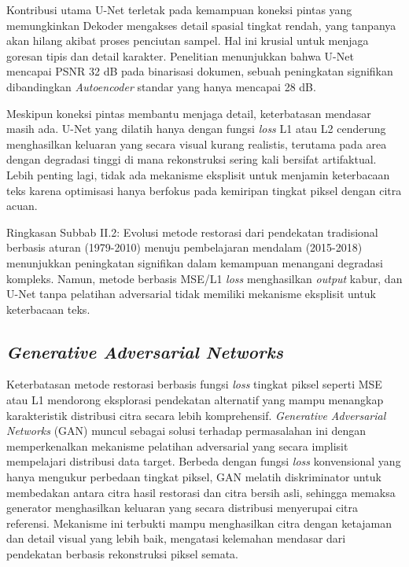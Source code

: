 \documentclass[12pt,a4paper]{article}
\begin{document}
\begin{enumerate}[leftmargin=*, labelindent=0pt, itemsep=1ex, topsep=0pt]
Kontribusi utama U-Net terletak pada kemampuan koneksi pintas yang memungkinkan Dekoder mengakses detail spasial tingkat rendah, yang tanpanya akan hilang akibat proses penciutan sampel. Hal ini krusial untuk menjaga goresan tipis dan detail karakter. Penelitian \parencite{tensmeyer2017} menunjukkan bahwa U-Net mencapai PSNR 32 dB pada binarisasi dokumen, sebuah peningkatan signifikan dibandingkan \textit{Autoencoder} standar yang hanya mencapai 28 dB.

Meskipun koneksi pintas membantu menjaga detail, keterbatasan mendasar masih ada. U-Net yang dilatih hanya dengan fungsi \textit{loss} L1 atau L2 cenderung menghasilkan keluaran yang secara visual kurang realistis, terutama pada area dengan degradasi tinggi di mana rekonstruksi sering kali bersifat artifaktual. Lebih penting lagi, tidak ada mekanisme eksplisit untuk menjamin keterbacaan teks karena optimisasi hanya berfokus pada kemiripan tingkat piksel dengan citra acuan.

\end{enumerate}

Ringkasan Subbab II.2: Evolusi metode restorasi dari pendekatan tradisional berbasis aturan (1979-2010) menuju pembelajaran mendalam (2015-2018) menunjukkan peningkatan signifikan dalam kemampuan menangani degradasi kompleks. Namun, metode berbasis MSE/L1 \textit{loss} menghasilkan \textit{output} kabur, dan U-Net tanpa \textnormal{pelatihan adversarial} tidak memiliki mekanisme eksplisit untuk keterbacaan teks.


\subsection{\textit{Generative Adversarial Networks}}
\label{subsec:gan-theory}

Keterbatasan metode restorasi berbasis fungsi \textit{loss} tingkat piksel seperti MSE atau L1 mendorong eksplorasi pendekatan alternatif yang mampu menangkap karakteristik distribusi citra secara lebih komprehensif. \textit{Generative Adversarial Networks} (GAN) muncul sebagai solusi terhadap permasalahan ini dengan memperkenalkan mekanisme pelatihan adversarial yang secara implisit mempelajari distribusi data target. Berbeda dengan fungsi \textit{loss} konvensional yang hanya mengukur perbedaan tingkat piksel, GAN melatih diskriminator untuk membedakan antara citra hasil restorasi dan citra bersih asli, sehingga memaksa generator menghasilkan keluaran yang secara distribusi menyerupai citra referensi. Mekanisme ini terbukti mampu menghasilkan citra dengan ketajaman dan detail visual yang lebih baik, mengatasi kelemahan mendasar dari pendekatan berbasis rekonstruksi piksel semata.
\end{document}

